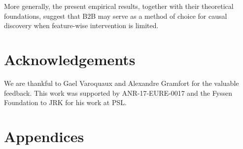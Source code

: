 \documentclass[preprint,12pt,3p]{elsarticle}
\begin{document}
More generally, the present empirical results, together with their theoretical
foundations, suggest that B2B may serve as a method of choice for causal
discovery when feature-wise intervention is limited.

\section{Acknowledgements}
We are thankful to Gael Varoquaux and Alexandre Gramfort for the valuable
feedback. This work was supported by ANR-17-EURE-0017 and the Fyssen Foundation
to JRK for his work at PSL.




\newpage
\clearpage
\section{Appendices}

\end{document}
